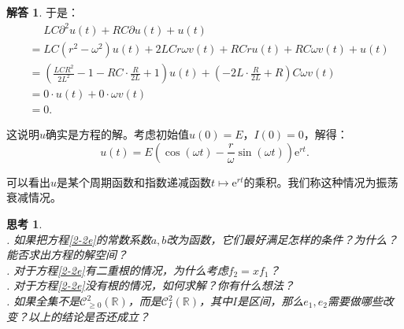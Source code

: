 \documentclass[12pt,UTF8]{ctexbook}
\newcommand{\e}{\mathrm{e}}
\theoremstyle{definition}
\newtheorem*{so}{解答}
\theoremstyle{plain}
\newtheorem{sk}{思考}[section]
\begin{document}
\begin{so}
    于是：
    \begin{align*}
        &\quad\,\, LC\partial^2 u(t) + RC\partial u(t) + u(t) \\
        &= LC(r^2 - \omega^2)u(t) + 2LCr\omega v(t) + RCru(t) + RC\omega v(t) +u(t) \\
        &= \left(\frac{LCR^2}{2L^2} - 1 - RC\cdot \frac{R}{2L} + 1\right)u(t) + \left(- 2L\cdot \frac{R}{2L} + R\right)C\omega v(t) \\
        &= 0 \cdot u(t) + 0\cdot \omega v(t) \\
        &= 0.
    \end{align*}

    这说明$u$确实是方程的解。考虑初始值$u(0) = E$，$I(0) = 0$，解得：
    $$ u(t) =  E\left(\cos{(\omega t)} - \frac{r}{\omega}\sin{(\omega t)}\right)\e^{rt}. $$

    可以看出$u$是某个周期函数和指数递减函数$t\mapsto \e^{rt}$的乘积。我们称这种情况为振荡衰减情况。

\end{so}

\begin{sk}
    \mbox{} \\
    . 如果把方程\eqref{2-2e}的常数系数$a,b$改为函数，它们最好满足怎样的条件？为什么？
    能否求出方程的解空间？\\
    . 对于方程\eqref{2-2e}有二重根的情况，为什么考虑$f_2 = xf_1$？\\
    . 对于方程\eqref{2-2e}没有根的情况，如何求解？你有什么想法？\\
    . 如果全集不是$\mathcal{C}^2_{\geqslant 0}(\mathbb{R})$，而是$\mathcal{C}^2_I(\mathbb{R})$，其中$I$是区间，那么$e_1, e_2$需要做哪些改变？以上的结论是否还成立？
    
\end{sk}
\end{document}
